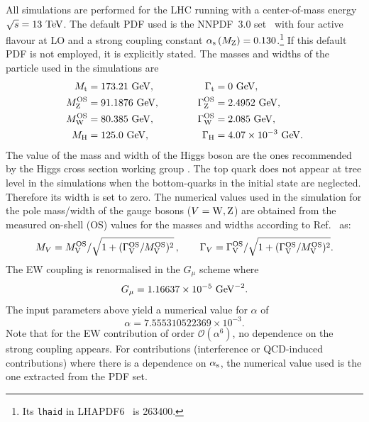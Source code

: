 \documentclass[11pt]{cernrep}
\begin{document}
All simulations are performed for the LHC running with a center-of-mass energy $\sqrt s = 13 {\rm~TeV}$.
The default PDF used is the NNPDF~3.0 set~\cite{Ball:2014uwa} with four active flavour at LO and a strong coupling constant $\alpha_{\rm s}\left( M_{\rm Z} \right) = 0.130$.\footnote{Its {\tt lhaid} in LHAPDF6~\cite{Buckley:2014ana} is 263400.} 
If this default PDF is not employed, it is explicitly stated.
%
The masses and widths of the particle used in the simulations are
%
\begin{alignat}{2}
                M_{\rm t}   &=  173.21 {\rm~GeV},             & \quad \quad \quad \Gamma_{\rm t} &= 0 {\rm~GeV},  \nonumber \\
                M_{\rm Z}^{\rm OS} &=  91.1876{\rm~GeV},      & \quad \quad \quad \Gamma^{\rm OS}_{\rm Z} &= 2.4952{\rm~GeV},  \nonumber \\
                M_{\rm W}^{\rm OS} &=  80.385{\rm~GeV},       & \Gamma^{\rm OS}_{\rm W} &= 2.085{\rm~GeV},  \nonumber \\
                M_{\rm H} &=  125.0{\rm~GeV}, 		      & \Gamma_{\rm H}   &=  4.07 \times 10^{-3}{\rm~GeV}.
\end{alignat}
%
The value of the mass and width of the Higgs boson are the ones recommended by the Higgs cross section working group \cite{deFlorian:2016spz}.
The top quark does not appear at tree level in the simulations when the bottom-quarks in the initial state are neglected.
Therefore its width is set to zero.
The numerical values used in the simulation for the pole mass/width of the gauge bosons ($V={\rm W,Z}$) are obtained from the measured on-shell (OS) values for the masses and widths according to Ref.~\cite{Bardin:1988xt} as:
%
\begin{equation}
        M_V = M_{\rm V}^{\rm OS}/\sqrt{1+(\Gamma_{\rm V}^{\rm OS}/M_{\rm V}^{\rm OS})^2}\,,\qquad  \Gamma_V = \Gamma_{\rm V}^{\rm OS}/\sqrt{1+(\Gamma_{\rm V}^{\rm OS}/M_{\rm V}^{\rm OS})^2}.
\end{equation}
%
The EW coupling is renormalised in the $G_\mu$ scheme \cite{Denner:2000bj} where
%
\begin{equation}
    G_{\mu}    = 1.16637\times 10^{-5}{\rm~GeV}^{-2}.
\end{equation}
%
The input parameters above yield a numerical value for $\alpha$ of
%
\begin{equation}
 \alpha = 7.555310522369 \times 10^{-3}.
\end{equation}
%
Note that for the EW contribution of order $\mathcal{O} (\alpha^6)$, no dependence on the strong coupling appears.
For contributions (interference or QCD-induced contributions) where there is a dependence on $\alpha_{\rm s}$, the numerical value used is the one extracted from the PDF set.
\end{document}
